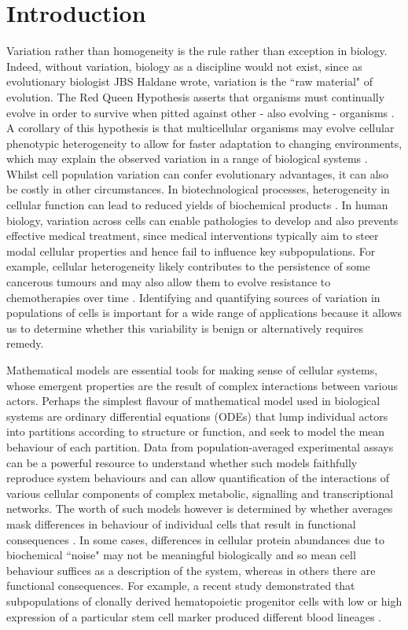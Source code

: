 \documentclass[10pt,letterpaper]{article}
\begin{document}
\section{Introduction}
Variation rather than homogeneity is the rule rather than exception in biology. Indeed, without variation, biology as a discipline would not exist, since as evolutionary biologist JBS Haldane wrote, variation is the ``raw material" of evolution. The Red Queen Hypothesis asserts that organisms must continually evolve in order to survive when pitted against other - also evolving - organisms \cite{ridley1994red}. A corollary of this hypothesis is that multicellular organisms may evolve cellular phenotypic heterogeneity to allow for faster adaptation to changing environments, which may explain the observed variation in a range of biological systems \cite{fraser2009chance}. Whilst cell population variation can confer evolutionary advantages, it can also be costly in other circumstances. In biotechnological processes, heterogeneity in cellular function can lead to reduced yields of biochemical products \cite{delvigne2014metabolic}. In human biology, variation across cells can enable pathologies to develop and also prevents effective medical treatment, since medical interventions typically aim to steer modal cellular properties and hence fail to influence key subpopulations. For example, cellular heterogeneity likely contributes to the persistence of some cancerous tumours \cite{gatenby2007cellular} and may also allow them to evolve resistance to chemotherapies over time \cite{altrock2015mathematics}. Identifying and quantifying sources of variation in populations of cells is important for a wide range of applications because it allows us to determine whether this variability is benign or alternatively requires remedy.

Mathematical models are essential tools for making sense of cellular systems, whose emergent properties are the result of complex interactions between various actors. Perhaps the simplest flavour of mathematical model used in biological systems are ordinary differential equations (ODEs) that lump individual actors into partitions according to structure or function, and seek to model the mean behaviour of each partition. Data from population-averaged experimental assays can be a powerful resource to understand whether such models faithfully reproduce system behaviours and can allow quantification of the interactions of various cellular components of complex metabolic, signalling and transcriptional networks. The worth of such models however is determined by whether averages mask differences in behaviour of individual cells that result in functional consequences \cite{altschuler2010cellular}. In some cases, differences in cellular protein abundances due to biochemical ``noise" may not be meaningful biologically \cite{elowitz2002stochastic} and so mean cell behaviour suffices as a description of the system, whereas in others there are functional consequences. For example, a recent study demonstrated that subpopulations of clonally derived hematopoietic progenitor cells with low or high expression of a particular stem cell marker produced different blood lineages \cite{chang2008transcriptome}. 
\end{document}
